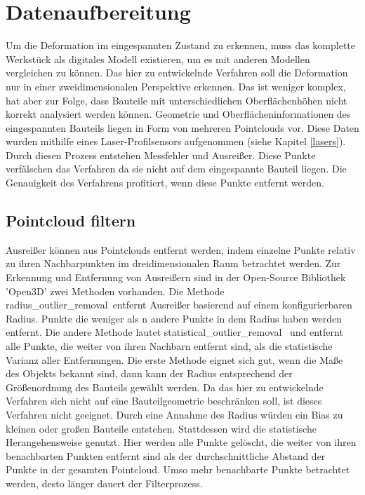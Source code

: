 

\chapter{Datenaufbereitung}

Um die Deformation im eingespannten Zustand zu erkennen, muss das komplette Werkstück
als digitales Modell existieren, um es mit anderen Modellen vergleichen zu können.
Das hier zu entwickelnde Verfahren soll die Deformation nur in einer zweidimensionalen Perspektive erkennen. 
Das ist weniger komplex, hat aber zur Folge, dass Bauteile mit unterschiedlichen 
Oberflächenhöhen nicht korrekt analysiert werden können. 
Geometrie und Oberflächeninformationen des eingespannten Bauteils liegen 
in Form von mehreren Pointclouds vor.
Diese Daten wurden mithilfe eines Laser-Profilsensors aufgenommen 
(siehe Kapitel \ref{lasers}). Durch diesen Prozess 
entstehen Messfehler und Ausreißer. Diese Punkte verfälschen das Verfahren da sie 
nicht auf dem eingespannte Bauteil liegen. Die Genauigkeit des Verfahrens profitiert, 
wenn diese Punkte entfernt werden.

\section{Pointcloud filtern}
    
Ausreißer können aus Pointclouds entfernt werden, indem einzelne Punkte 
relativ zu ihren Nachbarpunkten im dreidimensionalen Raum betrachtet werden.
Zur Erkennung und Entfernung von Ausreißern sind in der Open-Source
Bibliothek 'Open3D' zwei Methoden vorhanden. 
Die Methode \glqq radius\_outlier\_removal\grqq~entfernt Ausreißer basierend auf 
einem konfigurierbaren Radius. Punkte die weniger als n andere Punkte in dem Radius 
haben werden entfernt. Die andere Methode lautet 
\glqq statistical\_outlier\_removal\grqq~ 
und entfernt alle Punkte, die weiter von ihren Nachbarn entfernt sind, als die 
statistische Varianz aller Entfernungen.
Die erste Methode eignet sich gut, wenn die Maße des Objekts bekannt
sind, dann kann der Radius entsprechend der Größenordnung des Bauteils gewählt werden.
Da das hier zu entwickelnde Verfahren sich nicht auf eine Bauteilgeometrie 
beschränken soll, ist dieses Verfahren nicht geeignet. 
Durch eine Annahme des Radius würden ein Bias 
zu kleinen oder großen Bauteile entstehen.
Stattdessen wird die statistische Herangehensweise genutzt. 
Hier werden alle Punkte gelöscht, die weiter von ihren benachbarten Punkten entfernt
sind als der durchschnittliche Abstand der Punkte in der gesamten Pointcloud. 
Umso mehr benachbarte Punkte betrachtet werden, desto länger dauert der Filterprozess.

